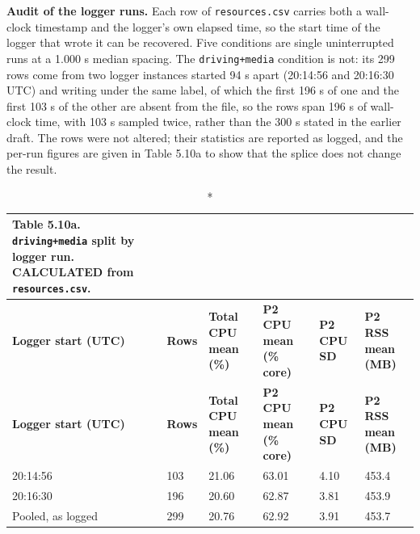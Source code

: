 \textbf{Audit of the logger runs.} Each row of \texttt{resources.csv} carries both a wall-clock timestamp and the logger's own elapsed time, so the start time of the logger that wrote it can be recovered. Five conditions are single uninterrupted runs at a 1.000 s median spacing. The \texttt{driving+media} condition is not: its 299 rows come from two logger instances started 94 s apart (20:14:56 and 20:16:30 UTC) and writing under the same label, of which the first 196 s of one and the first 103 s of the other are absent from the file, so the rows span 196 s of wall-clock time, with 103 s sampled twice, rather than the 300 s stated in the earlier draft. The rows were not altered; their statistics are reported as logged, and the per-run figures are given in Table 5.10a to show that the splice does not change the result.

\begin{center}
\footnotesize
\begin{longtable}{|p{2.2cm}|p{1.2cm}|p{2.6cm}|p{2.8cm}|p{1.8cm}|p{2.6cm}|}
\caption*{Table 5.10a. \texttt{driving+media} split by logger run. CALCULATED from \texttt{resources.csv}.}
\addcontentsline{lot}{table}{\protect\numberline{5.10a}\texttt{driving+media} split by logger run. CALCULATED from \texttt{resources.csv}.}
\\
\hline
\textbf{Logger start (UTC)} & \textbf{Rows} & \textbf{Total CPU mean (\%)} & \textbf{P2 CPU mean (\% core)} & \textbf{P2 CPU SD} & \textbf{P2 RSS mean (MB)} \\
\hline
\endfirsthead
\hline
\textbf{Logger start (UTC)} & \textbf{Rows} & \textbf{Total CPU mean (\%)} & \textbf{P2 CPU mean (\% core)} & \textbf{P2 CPU SD} & \textbf{P2 RSS mean (MB)} \\
\hline
\endhead
20:14:56 & 103 & 21.06 & 63.01 & 4.10 & 453.4 \\
\hline
20:16:30 & 196 & 20.60 & 62.87 & 3.81 & 453.9 \\
\hline
Pooled, as logged & 299 & 20.76 & 62.92 & 3.91 & 453.7 \\
\hline
\end{longtable}
\end{center}

